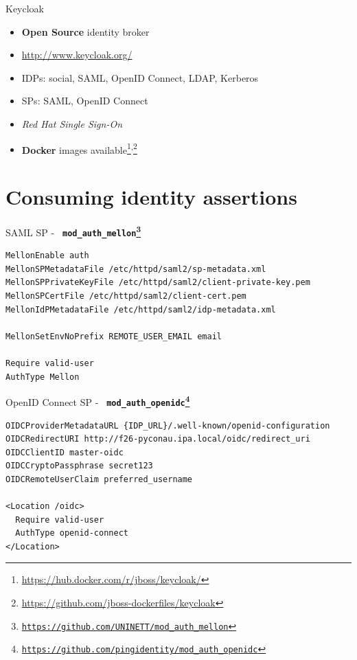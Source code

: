 \documentclass[ignorenonframetext,aspectratio=169]{beamer}
\providecommand{\tightlist}{%
  \setlength{\itemsep}{0pt}\setlength{\parskip}{0pt}}
\begin{document}
\begin{frame}{Keycloak}

\begin{itemize}
\tightlist
\item {\bf Open Source} identity broker
\item \url{http://www.keycloak.org/}
\item IDPs: social, SAML, OpenID Connect, LDAP, Kerberos
\item SPs: SAML, OpenID Connect
\item {\em Red Hat Single Sign-On}
\item {\bf Docker} images available\footnote{
        \url{https://hub.docker.com/r/jboss/keycloak/}
    }\textsuperscript{,}\footnote{
        \url{https://github.com/jboss-dockerfiles/keycloak}
    }
\end{itemize}
\end{frame}

\section{Consuming identity assertions}

\begin{frame}[fragile]{SAML SP - \bf \tt
    mod\_auth\_mellon\footnote{\url{https://github.com/UNINETT/mod_auth_mellon}}}

\begin{verbatim}
MellonEnable auth
MellonSPMetadataFile /etc/httpd/saml2/sp-metadata.xml
MellonSPPrivateKeyFile /etc/httpd/saml2/client-private-key.pem
MellonSPCertFile /etc/httpd/saml2/client-cert.pem
MellonIdPMetadataFile /etc/httpd/saml2/idp-metadata.xml

MellonSetEnvNoPrefix REMOTE_USER_EMAIL email

Require valid-user
AuthType Mellon
\end{verbatim}

\end{frame}

\begin{frame}[fragile]{OpenID Connect SP - \bf \tt
    mod\_auth\_openidc\footnote{\url{https://github.com/pingidentity/mod_auth_openidc}}}

\begin{verbatim}
OIDCProviderMetadataURL {IDP_URL}/.well-known/openid-configuration
OIDCRedirectURI http://f26-pyconau.ipa.local/oidc/redirect_uri
OIDCClientID master-oidc
OIDCCryptoPassphrase secret123
OIDCRemoteUserClaim preferred_username

<Location /oidc>
  Require valid-user
  AuthType openid-connect
</Location>
\end{verbatim}

\end{frame}
\end{document}
